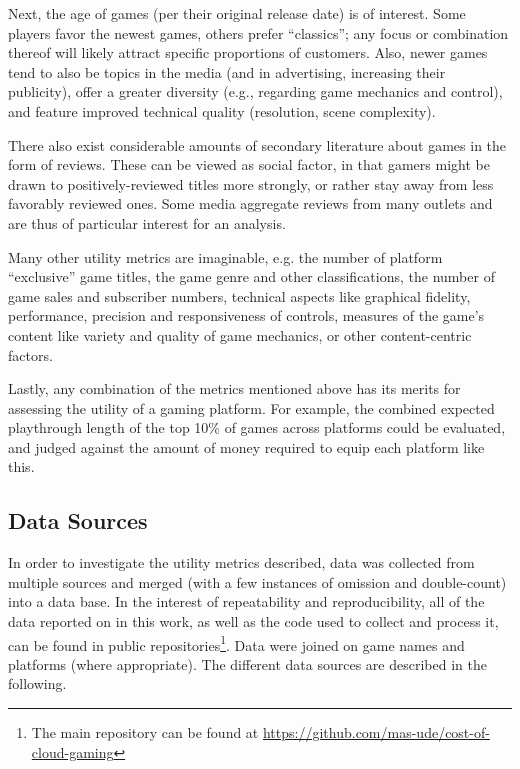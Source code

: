 Next, the age of games (per their original release date) is of
interest. Some players favor the newest games, others prefer ``classics'';
any focus or combination thereof will likely attract specific
proportions of customers. Also, newer games tend to also be topics
in the media (and in advertising, increasing their publicity),
offer a greater diversity (e.g., regarding game mechanics and control),
and feature improved technical quality (resolution, scene complexity).


There also exist considerable amounts of secondary literature about
games in the form of reviews. These can be viewed as social factor,
in that gamers might be drawn to positively-reviewed titles more
strongly, or rather stay away from less favorably reviewed ones.
Some media aggregate reviews from many outlets and
are thus of particular interest for an analysis.

Many other utility metrics are imaginable, e.g.
the number of platform ``exclusive'' game titles,
the game genre and other classifications,
the number of game sales and subscriber numbers,
technical aspects like graphical fidelity, performance, precision
and responsiveness of controls,
measures of the game's content like variety and quality of game mechanics,
or other content-centric factors.

Lastly, any combination of the metrics mentioned above has its
merits for assessing the utility of a gaming platform. For example,
the combined expected playthrough length of the top 10\% of games
across platforms could be evaluated, and judged against the amount
of money required to equip each platform like this.


\subsection{Data Sources}
In order to investigate the utility metrics described, data was collected from
multiple sources and merged (with a few instances of omission and
double-count) into a data base. In the interest of repeatability and
reproducibility, all of the data reported on in this work, as well as
the code used to collect and process it, can be found in public
repositories\footnote{The main repository can be found at
\url{https://github.com/mas-ude/cost-of-cloud-gaming}}.
Data were joined on game names and platforms (where appropriate).
The different data sources are described in the following.

